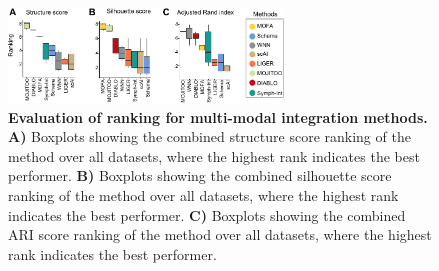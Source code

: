 \begin{figure}[!ht]
	\centering
	\includegraphics[width=0.65\textwidth]{ranking/fig}
	\vspace{0.1cm}
	\caption[Evaluation of ranking for multi-modal integration methods.]{\textbf{Evaluation of ranking for multi-modal integration methods.} \textbf{A)} Boxplots showing the combined structure score ranking of the method over all datasets, where the highest rank indicates the best performer. \textbf{B)} Boxplots showing the combined silhouette score ranking of the method over all datasets, where the highest rank indicates the best performer. \textbf{C)} Boxplots showing the combined ARI score ranking of the method over all datasets, where the highest rank indicates the best performer.}
	\label{fig:ranking}
\end{figure}

